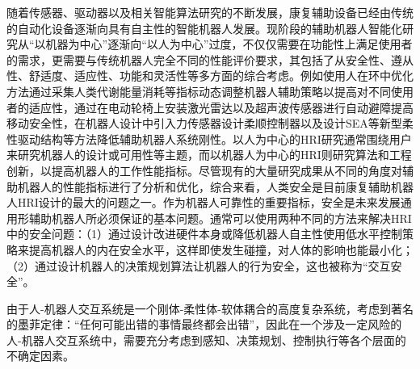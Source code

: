 随着传感器、驱动器以及相关智能算法研究的不断发展，康复辅助设备已经由传统的自动化设备逐渐向具有自主性的智能机器人发展。现阶段的辅助机器人智能化研究从``以机器为中心''逐渐向``以人为中心''过度，不仅仅需要在功能性上满足使用者的需求，更需要与传统机器人完全不同的性能评价要求，其包括了从安全性、遵从性、舒适度、适应性、功能和灵活性等多方面的综合考虑\cite{heSurveyHumancenteredIntelligent2017b}。例如使用人在环中优化方法\cite{dingHumanintheloopOptimizationHip2018a,zhangHumanintheloopOptimizationExoskeleton2017a,awadSoftRoboticExosuit2017}通过采集人类代谢能量消耗等指标动态调整机器人辅助策略以提高对不同使用者的适应性，通过在电动轮椅上安装激光雷达以及超声波传感器进行自动避障提高移动安全性\cite{fosterReflectanceFieldMap2023,parkDiscretetimeDynamicModeling2017,walterFrameworkLearningSemantic2014}，在机器人设计中引入力传感器设计柔顺控制器\cite{hong-guljunWalkingSittostandSupport2011,inhokimKinematicAnalysisSittostand2011}以及设计SEA等新型柔性驱动结构\cite{zhongGaitSymmetryEnhancement2022}等方法降低辅助机器人系统刚性。以人为中心的HRI研究通常围绕用户来研究机器人的设计或可用性等主题，而以机器人为中心的HRI则研究算法和工程创新，以提高机器人的工作性能指标。尽管现有的大量研究成果从不同的角度对辅助机器人的性能指标进行了分析和优化，综合来看，人类安全是目前康复辅助机器人HRI设计的最大的问题之一\cite{tadeleSafetyDomesticRobotics2014}。作为机器人可靠性的重要指标，安全是未来发展通用形辅助机器人所必须保证的基本问题。通常可以使用两种不同的方法来解决HRI中的安全问题：（1）通过设计改进硬件本身或降低机器人自主性使用低水平控制策略来提高机器人的内在安全水平，这样即使发生碰撞，对人体的影响也能最小化\cite{haddadinNewInsightsConcerning2010}；（2）通过设计机器人的决策规划算法让机器人的行为安全，这也被称为``交互安全''\cite{liuDesigningRobotBehavior}。

由于人-机器人交互系统是一个刚体-柔性体-软体耦合的高度复杂系统，考虑到著名的墨菲定律：``任何可能出错的事情最终都会出错''，因此在一个涉及一定风险的人-机器人交互系统中，需要充分考虑到感知、决策规划、控制执行等各个层面的不确定因素。

